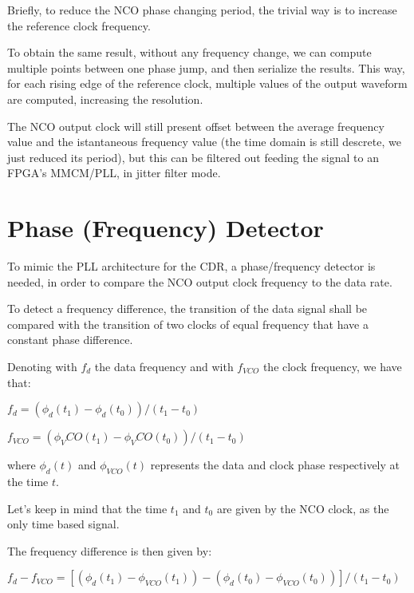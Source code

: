 \documentclass[letterpaper,10pt,english,openany,oneside]{sphinxmanual}
\begin{document}
\begin{DUlineblock}{0em}
\item[] Briefly, to reduce the NCO phase changing period, the trivial way is to increase the reference clock frequency.
\item[] To obtain the same result, without any frequency change, we can compute multiple points between one phase jump, and then serialize the results. This way, for each rising edge of the reference clock, multiple values of the output waveform are computed, increasing the resolution.
\end{DUlineblock}

The NCO output clock will still present offset between the average frequency value and the istantaneous frequency value (the time domain is still descrete, we just reduced its period), but this can be filtered out feeding the signal to an FPGA’s MMCM/PLL, in jitter filter mode.


\chapter{Phase (Frequency) Detector}
\label{\detokenize{paper/phase_detector:phase-frequency-detector}}\label{\detokenize{paper/phase_detector::doc}}
To mimic the PLL architecture for the CDR, a phase/frequency detector is needed, in order to compare the NCO output clock frequency to the data rate.

To detect a frequency difference, the transition of the data signal shall be compared with the transition of two clocks of equal frequency that have a constant phase difference.

Denoting with \(f_d\) the data frequency and with \(f_{VCO}\) the clock frequency, we have that:

\(f_d = (\phi_d(t_1) - \phi_d(t_0)) / (t_1 - t_0)\)

\(f_{VCO} = (\phi_VCO(t_1) - \phi_VCO(t_0)) / (t_1 - t_0)\)

\begin{DUlineblock}{0em}
\item[] where \(\phi_d(t)\) and \(\phi_{VCO}(t)\) represents the data and clock phase respectively at the time \(t\).
\item[] Let’s keep in mind that the time \(t_1\) and \(t_0\) are given by the NCO clock, as the only time based signal.
\end{DUlineblock}

The frequency difference is then given by:

\(f_d - f_{VCO} = [(\phi_d(t_1) - \phi_{VCO}(t_1)) - (\phi_d(t_0) - \phi_{VCO}(t_0))] / (t_1 - t_0)\)
\end{document}
